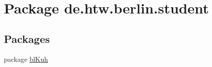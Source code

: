 \hypertarget{namespacede_1_1htw_1_1berlin_1_1student}{\section{Package de.\-htw.\-berlin.\-student}
\label{namespacede_1_1htw_1_1berlin_1_1student}
}
\subsection*{Packages}
\begin{DoxyCompactItemize}
\item 
package \hyperlink{namespacede_1_1htw_1_1berlin_1_1student_1_1bl_kuh}{bl\-Kuh}
\end{DoxyCompactItemize}
